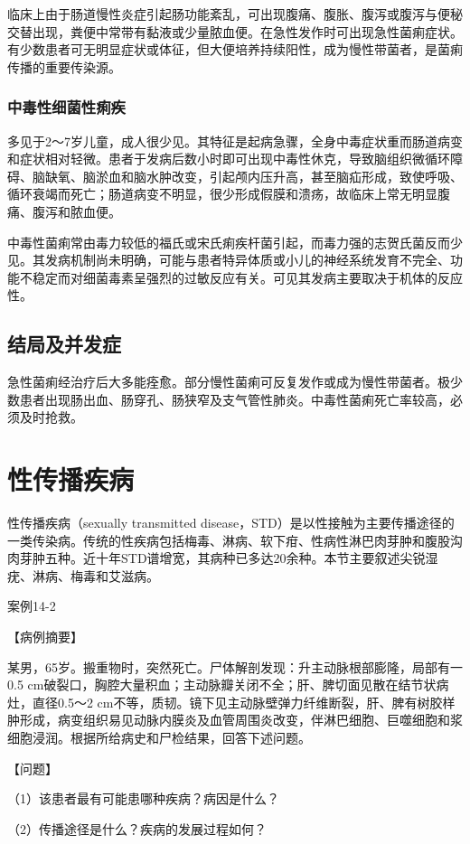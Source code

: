 临床上由于肠道慢性炎症引起肠功能紊乱，可出现腹痛、腹胀、腹泻或腹泻与便秘交替出现，粪便中常带有黏液或少量脓血便。在急性发作时可出现急性菌痢症状。有少数患者可无明显症状或体征，但大便培养持续阳性，成为慢性带菌者，是菌痢传播的重要传染源。

\subsubsection{中毒性细菌性痢疾}

多见于2～7岁儿童，成人很少见。其特征是起病急骤，全身中毒症状重而肠道病变和症状相对轻微。患者于发病后数小时即可出现中毒性休克，导致脑组织微循环障碍、脑缺氧、脑淤血和脑水肿改变，引起颅内压升高，甚至脑疝形成，致使呼吸、循环衰竭而死亡；肠道病变不明显，很少形成假膜和溃疡，故临床上常无明显腹痛、腹泻和脓血便。

中毒性菌痢常由毒力较低的福氏或宋氏痢疾杆菌引起，而毒力强的志贺氏菌反而少见。其发病机制尚未明确，可能与患者特异体质或小儿的神经系统发育不完全、功能不稳定而对细菌毒素呈强烈的过敏反应有关。可见其发病主要取决于机体的反应性。

\subsection{结局及并发症}

急性菌痢经治疗后大多能痊愈。部分慢性菌痢可反复发作或成为慢性带菌者。极少数患者出现肠出血、肠穿孔、肠狭窄及支气管性肺炎。中毒性菌痢死亡率较高，必须及时抢救。

\section{性传播疾病}

性传播疾病（sexually transmitted
disease，STD）是以性接触为主要传播途径的一类传染病。传统的性疾病包括梅毒、淋病、软下疳、性病性淋巴肉芽肿和腹股沟肉芽肿五种。近十年STD谱增宽，其病种已多达20余种。本节主要叙述尖锐湿疣、淋病、梅毒和艾滋病。

\begin{framed}
    {案例14-2}

    {【病例摘要】}

    某男，65岁。搬重物时，突然死亡。尸体解剖发现：升主动脉根部膨隆，局部有一0.5
    cm破裂口，胸腔大量积血；主动脉瓣关闭不全；肝、脾切面见散在结节状病灶，直径0.5～2
    cm不等，质韧。镜下见主动脉壁弹力纤维断裂，肝、脾有树胶样肿形成，病变组织易见动脉内膜炎及血管周围炎改变，伴淋巴细胞、巨噬细胞和浆细胞浸润。根据所给病史和尸检结果，回答下述问题。

    {【问题】}

    （1）该患者最有可能患哪种疾病？病因是什么？

    （2）传播途径是什么？疾病的发展过程如何？
\end{framed}


